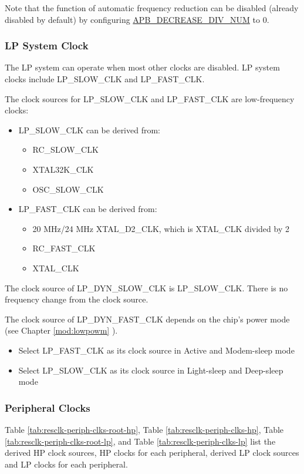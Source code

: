 \documentclass[main\_\_EN.tex]{subfiles}
\begin{document}
Note that the function of automatic frequency reduction can be disabled (already disabled by default) by configuring \hyperref[fielddesc:PCRAPBDECREASEDIVNUM]{APB\_DECREASE\_DIV\_NUM} to 0.




\subsubsection{LP System Clock}

The LP system can operate when most other clocks are disabled. LP system clocks include LP\_SLOW\_CLK and LP\_FAST\_CLK.

The clock sources for LP\_SLOW\_CLK and LP\_FAST\_CLK are low-frequency clocks:
\begin{itemize}
    \item LP\_SLOW\_CLK can be derived from:
    \begin{itemize}
        \item RC\_SLOW\_CLK
        \item XTAL32K\_CLK
        \item OSC\_SLOW\_CLK
    \end{itemize}
    \item LP\_FAST\_CLK can be derived from:
    \begin{itemize}
        \item 20 MHz/24 MHz XTAL\_D2\_CLK, which is XTAL\_CLK divided by 2
        \item RC\_FAST\_CLK
        \item XTAL\_CLK
    \end{itemize}
\end{itemize}


The clock source of LP\_DYN\_SLOW\_CLK is LP\_SLOW\_CLK. There is no frequency change from the clock source.

The clock source of LP\_DYN\_FAST\_CLK depends on the chip's power mode (see Chapter \ref{mod:lowpowm} \textit{}).

\begin{itemize}
    \item Select LP\_FAST\_CLK as its clock source in Active and Modem-sleep mode
    \item Select LP\_SLOW\_CLK as its clock source in Light-sleep and Deep-sleep mode
\end{itemize}

\subsubsection{Peripheral Clocks}
Table \ref{tab:resclk-periph-clks-root-hp}, Table \ref{tab:resclk-periph-clks-hp}, Table \ref{tab:resclk-periph-clks-root-lp}, and Table \ref{tab:resclk-periph-clks-lp} list the derived HP clock sources, HP clocks for each peripheral, derived LP clock sources and LP clocks for each peripheral.
\end{document}
